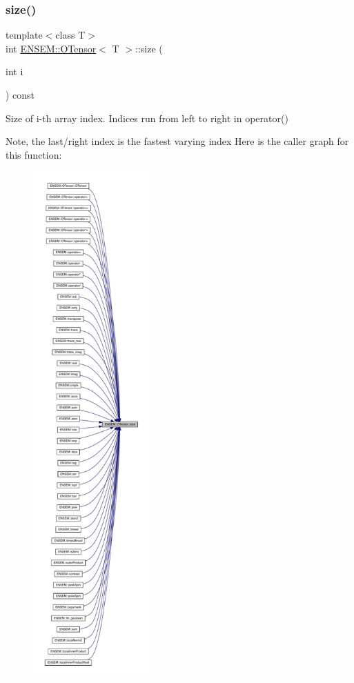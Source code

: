 \subsubsection{\texorpdfstring{size()}{size()}\hspace{0.1cm}{\footnotesize\ttfamily [1/6]}}
{\footnotesize\ttfamily template$<$class T$>$ \\
int \mbox{\hyperlink{classENSEM_1_1OTensor}{E\+N\+S\+E\+M\+::\+O\+Tensor}}$<$ T $>$\+::size (\begin{DoxyParamCaption}\item[{int}]{i }\end{DoxyParamCaption}) const\hspace{0.3cm}{\ttfamily [inline]}}



Size of i-\/th array index. Indices run from left to right in operator() 

Note, the last/right index is the fastest varying index Here is the caller graph for this function\+:
\nopagebreak
\begin{figure}[H]
\begin{center}
\leavevmode
\includegraphics[height=550pt]{da/d8a/classENSEM_1_1OTensor_aeb39779caeadcbcea94d9ef629913287_icgraph}
\end{center}
\end{figure}
\mbox{\label{classENSEM_1_1OTensor_aeb39779caeadcbcea94d9ef629913287}} 
